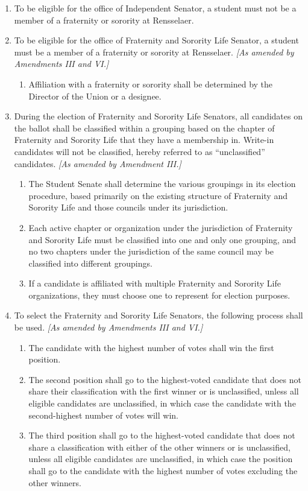 
\begin{enumerate}
\item To be eligible for the office of Independent Senator, a student must not be a member of a fraternity or sorority at Rensselaer.
\item To be eligible for the office of Fraternity and Sorority Life Senator, a student must be a member of a fraternity or sorority at Rensselaer. \textit{[As amended by Amendments III and VI.]}
  \begin{enumerate}
  \item Affiliation with a fraternity or sorority shall be determined by the Director of the Union or a designee.
  \end{enumerate}
\item During the election of Fraternity and Sorority Life Senators, all candidates on the ballot shall be classified within a grouping based on the chapter of Fraternity and Sorority Life that they have a membership in. Write-in candidates will not be classified, hereby referred to as ``unclassified'' candidates. \textit{[As amended by Amendment III.]}
  \begin{enumerate}
  \item The Student Senate shall determine the various groupings in its election procedure, based primarily on the existing structure of Fraternity and Sorority Life and those councils under its jurisdiction.
  \item Each active chapter or organization under the jurisdiction of Fraternity and Sorority Life must be classified into one and only one grouping, and no two chapters under the jurisdiction of the same council may be classified into different groupings.
  \item If a candidate is affiliated with multiple Fraternity and Sorority Life organizations, they must choose one to represent for election purposes.
  \end{enumerate}
\item To select the Fraternity and Sorority Life Senators, the following process shall be used. \textit{[As amended by Amendments III and VI.]}
  \begin{enumerate}
  \item The candidate with the highest number of votes shall win the first position.
  \item The second position shall go to the highest-voted candidate that does not share their classification with the first winner or is unclassified, unless all eligible candidates are unclassified, in which case the candidate with the second-highest number of votes will win.
  \item The third position shall go to the highest-voted candidate that does not share a classification with either of the other winners or is unclassified, unless all eligible candidates are unclassified, in which case the position shall go to the candidate with the highest number of votes excluding the other winners.
  \end{enumerate}
\end{enumerate}

